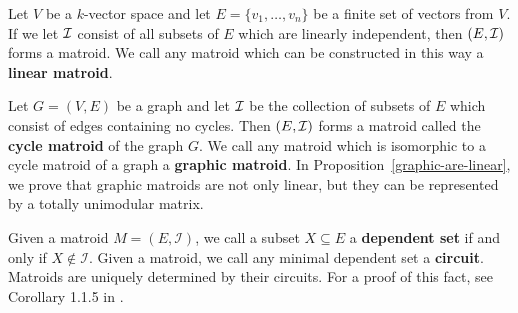 \documentclass{puthesis-UG}
\begin{document}
\begin{example}  \label{linear-matroid}
	Let $V$ be a $k$-vector space and let $E = \{v_1, \ldots, v_n\}$ be a finite set of vectors from $V$. If we let $\mathcal{I}$ consist of all subsets of $E$ which are linearly independent, then $(E, \mathcal{I})$ forms a matroid. We call any matroid which can be constructed in this way a \textbf{linear matroid}. 
\end{example}

\begin{example} 
	Let $G = (V, E)$ be a graph and let $\mathcal{I}$ be the collection of subsets of $E$ which consist of edges containing no cycles. Then $(E, \mathcal{I})$ forms a matroid called the \textbf{cycle matroid} of the graph $G$. We call any matroid which is isomorphic to a cycle matroid of a graph a \textbf{graphic matroid}. In Proposition~\ref{graphic-are-linear}, we prove that graphic matroids are not only linear, but they can be represented by a totally unimodular matrix. 
\end{example}
\begin{prop} \label{graphic-are-linear}
	
\end{prop}

\begin{example}

\end{example}


Given a matroid $M = (E, \mathcal{I})$, we call a subset $X \subseteq E$ a \textbf{dependent set} if and only if $X \notin \mathcal{I}$. Given a matroid, we call any minimal dependent set a \textbf{circuit}. Matroids are uniquely determined by their circuits. For a proof of this fact, see Corollary 1.1.5 in \cite{10.5555/1197093}.
\end{document}
